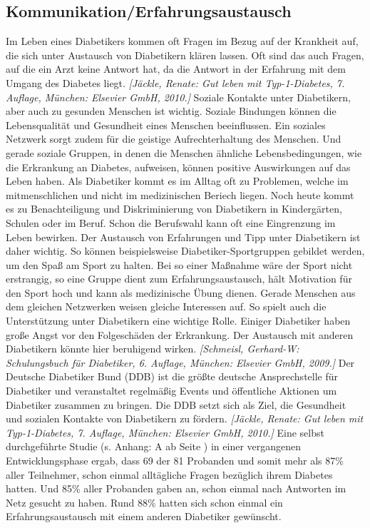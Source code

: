 \documentclass[a4paper,11pt]{article}%
\renewcommand{\\}{\vspace*{0.5\baselineskip} \newline}
\begin{document}
\subsection{Kommunikation/Erfahrungsaustausch}
	Im Leben eines Diabetikers kommen oft Fragen im Bezug auf der Krankheit auf, die sich unter Austausch von Diabetikern klären lassen. Oft sind das auch Fragen, auf die ein Arzt keine Antwort hat, da die Antwort in der Erfahrung mit dem Umgang des Diabetes liegt. \emph{[Jäckle, Renate: Gut leben mit Typ-1-Diabetes, 7. Auflage, München: Elsevier GmbH, 2010.]}\\
	Soziale Kontakte unter Diabetikern, aber auch zu gesunden Menschen ist wichtig. Soziale Bindungen können die Lebensqualität und Gesundheit eines Menschen beeinflussen. Ein soziales Netzwerk sorgt zudem für die geistige Aufrechterhaltung des Menschen. Und gerade soziale Gruppen, in denen die Menschen ähnliche Lebensbedingungen, wie die Erkrankung an Diabetes, aufweisen, können positive Auswirkungen auf das Leben haben. \newline
	Als Diabetiker kommt es im Alltag oft zu Problemen, welche im mitmenschlichen und nicht im medizinischen Beriech liegen. Noch heute kommt es zu Benachteiligung und Diskriminierung von Diabetikern in Kindergärten, Schulen oder im Beruf. Schon die Berufswahl kann oft eine Eingrenzung im Leben bewirken. Der Austausch von Erfahrungen und Tipp unter Diabetikern ist daher wichtig. So können beispielsweise Diabetiker-Sportgruppen gebildet werden, um den Spaß am Sport zu halten. Bei so einer Maßnahme wäre der Sport nicht erstrangig, so eine Gruppe dient zum Erfahrungsaustausch, hält Motivation für den Sport hoch und kann als medizinische Übung dienen. Gerade Menschen aus dem gleichen Netzwerken weisen gleiche Interessen auf. So spielt auch die Unterstützung unter Diabetikern eine wichtige Rolle. Einiger Diabetiker haben große Angst vor den Folgeschäden der Erkrankung. Der Austausch mit anderen Diabetikern könnte hier beruhigend wirken.  \emph{[Schmeisl, Gerhard-W: Schulungsbuch für Diabetiker, 6. Auflage, München: Elsevier GmbH, 2009.]} \newline
	Der Deutsche Diabetiker Bund (DDB) ist die größte deutsche Ansprechstelle für Diabetiker und veranstaltet regelmäßig Events und öffentliche Aktionen um Diabetiker zusammen zu bringen. Die DDB setzt sich als Ziel, die Gesundheit und sozialen Kontakte von Diabetikern zu fördern. \emph{[Jäckle, Renate: Gut leben mit Typ-1-Diabetes, 7. Auflage, München: Elsevier GmbH, 2010.]}\\
	Eine selbst durchgeführte Studie (s. Anhang: A  ab Seite \pageref{section:Evaluation}) in einer vergangenen Entwicklungsphase ergab, dass 69 der 81 Probanden und somit mehr als 87\% aller Teilnehmer, schon einmal alltägliche Fragen bezüglich ihrem Diabetes hatten. Und 85\% aller Probanden gaben an, schon einmal nach Antworten im Netz gesucht zu haben. Rund 88\% hatten sich schon einmal ein Erfahrungsaustausch mit einem anderen Diabetiker gewünscht.\\
\end{document}
